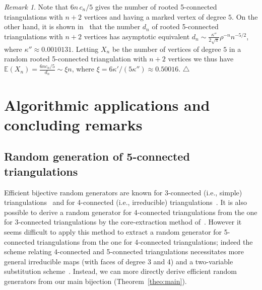 \documentclass[letter]{amsart}
\numberwithin{theo}{section}
\theoremstyle{remark}
\newtheorem{remark}[theo]{Remark}
\begin{document}
\begin{remark}\label{rk:number_degree5}
Note that $6n\,c_n/5$ gives the number of rooted 5-connected triangulations with $n+2$ vertices and having a marked vertex of degree $5$. On the other hand, it is shown in~\cite{gao2001} that the number $d_n$ of rooted 5-connected triangulations with $n+2$ vertices has asymptotic equivalent $d_n\sim \frac{\kappa''}{2\sqrt{\pi}}\rho^{-n}n^{-5/2}$, where $\kappa''\approx 0.0010131$. Letting $X_n$ be the number of vertices of degree $5$ in a random rooted  5-connected triangulation with $n+2$ vertices we thus have $\mathbb{E}(X_n)=\frac{6nc_n/5}{d_n}\sim \xi n$, where $\xi=6\kappa'/(5\kappa'')\approx 0.50016$. 
 \hfill$\triangle$
\end{remark}

\section{Algorithmic applications and concluding remarks}\label{sec:algo}
\subsection{Random generation of 5-connected triangulations} 
Efficient bijective random generators are known for 3-connected (i.e., simple) triangulations~\cite{PS06} and for 4-connected (i.e., irreducible) triangulations~\cite{Fu07b}. It is also possible to derive a random generator for 4-connected triangulations from the one for 3-connected triangulations by the core-extraction method of~\cite{Schaeffer99}. However it seems difficult to apply this method to extract a random generator for 5-connected triangulations from the one for 4-connected triangulations; indeed the scheme relating 4-connected and 5-connected triangulations necessitates more general irreducible maps (with faces of degree 3 and 4) and a two-variable substitution scheme~\cite{gao2001}. Instead, we can more directly derive efficient random generators from our main bijection (Theorem~\ref{theo:main}).    
\end{document}

